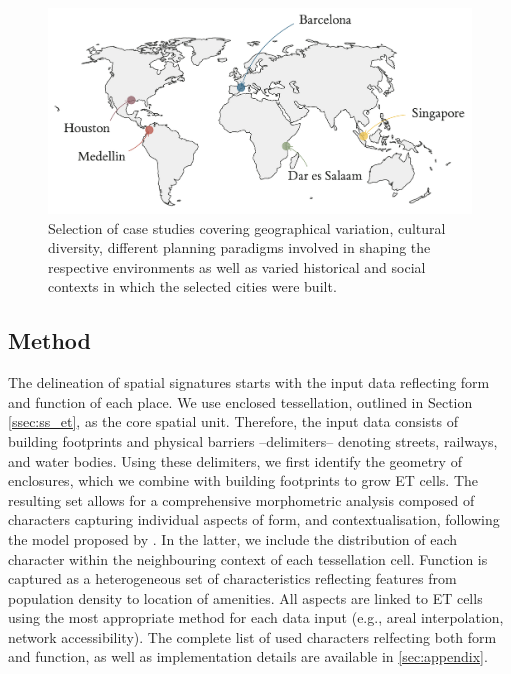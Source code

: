 \begin{figure}
    \includegraphics[width=0.75\linewidth, center]{figures/examples_map.pdf}
    \caption{Selection of case studies covering geographical variation,
    cultural diversity, different planning paradigms involved in shaping the
    respective environments as well as varied historical and social contexts in which the
    selected cities were built.}
    \label{fig:world_map}
\end{figure}

\subsection{Method}



The delineation of spatial signatures starts with the input data reflecting form and
function of each place. We use enclosed tessellation, outlined in Section
\ref{ssec:ss_et}, as the core spatial unit. Therefore, the input
data consists of building footprints and physical barriers --delimiters-- denoting streets,
railways, and water bodies.
Using these delimiters, we first identify the geometry of enclosures, which we
combine with building footprints to grow ET cells.
The resulting set allows for a comprehensive morphometric analysis
composed of characters capturing individual aspects of form, and
contextualisation, following the model proposed by
\citealp{fleischmann2021methodological}. In the latter, we
include the distribution of each character within the neighbouring context of each
tessellation cell.
Function is captured as a heterogeneous set of characteristics reflecting
features from
population density to location of amenities. All aspects are linked to ET cells
using the most appropriate method for each data input (e.g., areal
        interpolation,
network accessibility). The complete list of used characters relfecting both form and
function, as well as implementation details are available in \ref{sec:appendix}.

